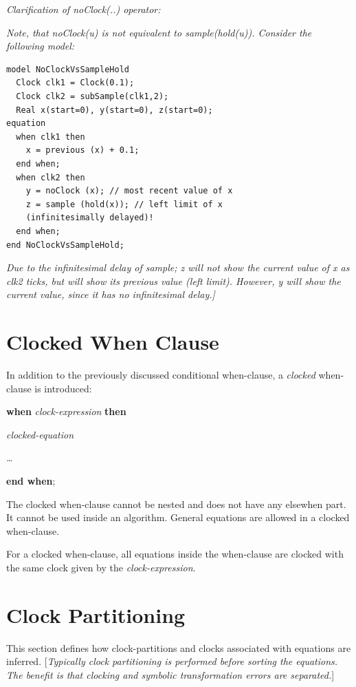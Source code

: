 \documentclass[10pt,a4paper]{report}
\def\doublelabel#1{\label{#1}\hypertarget{#1}{}}
\begin{document}
\emph{Clarification of noClock(..) operator:}

\emph{Note, that noClock(u) is not equivalent to sample(hold(u)).
Consider the following model:}

\begin{lstlisting}[language=modelica]
model NoClockVsSampleHold
  Clock clk1 = Clock(0.1);
  Clock clk2 = subSample(clk1,2);
  Real x(start=0), y(start=0), z(start=0);
equation
  when clk1 then
    x = previous (x) + 0.1;
  end when;
  when clk2 then
    y = noClock (x); // most recent value of x
    z = sample (hold(x)); // left limit of x
    (infinitesimally delayed)!
  end when;
end NoClockVsSampleHold;
\end{lstlisting}

\emph{Due to the infinitesimal delay of sample; z will not show the
current value of x as clk2 ticks, but will show its previous value (left
limit). However, y will show the current value, since it has no
infinitesimal delay.{]}}

\section{Clocked When Clause}\doublelabel{clocked-when-clause}

In addition to the previously discussed conditional when-clause, a
\emph{clocked} when-clause is introduced:

\textbf{when} \emph{clock-expression} \textbf{then}

\emph{clocked-equation}

\emph{\ldots{}}

\textbf{end when};

The clocked when-clause cannot be nested and does not have any elsewhen
part. It cannot be used inside an algorithm. General equations are
allowed in a clocked when-clause.

For a clocked when-clause, all equations inside the when-clause are
clocked with the same clock given by the \emph{clock-expression}.

\section{Clock Partitioning}\doublelabel{clock-partitioning}

This section defines how clock-partitions and clocks associated with
equations are inferred. {[}\emph{Typically clock partitioning is
performed before sorting the equations. The benefit is that clocking and
symbolic transformation errors are separated.}{]}
\end{document}
